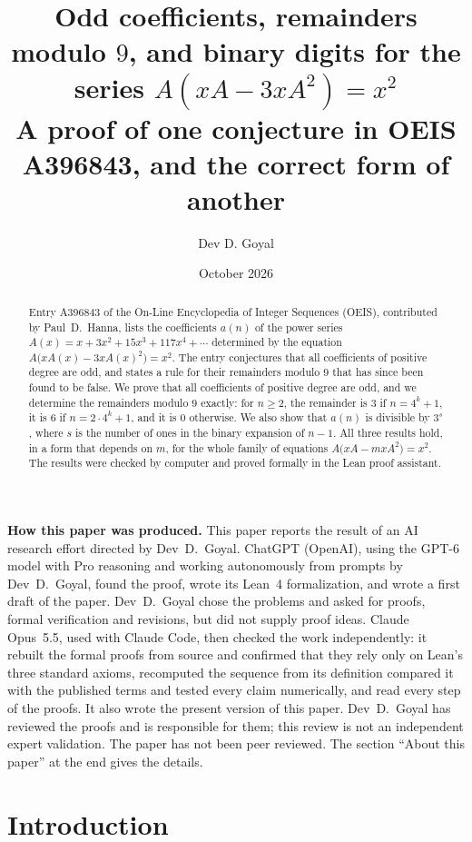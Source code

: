 \documentclass[11pt,a4paper]{article}
\title{Odd coefficients, remainders modulo $9$, and binary digits for the series $A(xA-3xA^2)=x^2$\\[6pt]\large A proof of one conjecture in OEIS A396843, and the correct form of another}
\author{Dev D. Goyal}
\date{October 2026}
\theoremstyle{definition}
\theoremstyle{remark}
\begin{document}
\maketitle
\begin{abstract}
Entry A396843 of the On-Line Encyclopedia of Integer Sequences (OEIS), contributed by Paul~D.~Hanna, lists the
coefficients $a(n)$ of the power series $A(x)=x+3x^2+15x^3+117x^4+\cdots$ determined by the equation
$A\bigl(xA(x)-3xA(x)^2\bigr)=x^2$. The entry conjectures that all coefficients of positive degree are odd, and states a rule for their
remainders modulo $9$ that has since been found to be false. We prove that all coefficients of positive degree are odd, and we determine
the remainders modulo $9$ exactly: for $n\ge2$, the remainder is $3$ if $n=4^k+1$, it is $6$ if $n=2\cdot4^k+1$, and it
is $0$ otherwise. We also show that $a(n)$ is divisible by $3^s$, where $s$ is the number of ones in the binary expansion
of $n-1$. All three results hold, in a form that depends on $m$, for the whole family of equations
$A\bigl(xA-mxA^2\bigr)=x^2$. The results were checked by computer and proved formally in the Lean proof assistant.
\end{abstract}
\begin{center}\begin{minipage}{0.88\linewidth}\small
\textbf{How this paper was produced.} This paper reports the result of an AI research effort directed by
Dev~D.~Goyal. ChatGPT (OpenAI), using the GPT-6 model with Pro reasoning and working autonomously from prompts by
Dev~D.~Goyal, found the proof, wrote its Lean~4 formalization, and wrote a first draft of the paper.
Dev~D.~Goyal chose the problems and asked for proofs, formal verification and revisions, but did not supply proof
ideas. Claude Opus~5.5, used with Claude Code, then checked the work independently: it rebuilt the formal proofs from
source and confirmed that they rely only on Lean's three standard axioms, recomputed the sequence from its definition
compared it with the published terms and tested every claim numerically, and read every step of the proofs. It also wrote the present
version of this paper.
Dev~D.~Goyal has reviewed the proofs and is responsible for them; this review is not an independent expert validation.
The paper has not been peer reviewed.
The section ``About this paper'' at the end gives the details.
\end{minipage}\end{center}

\section{Introduction}
\end{document}
